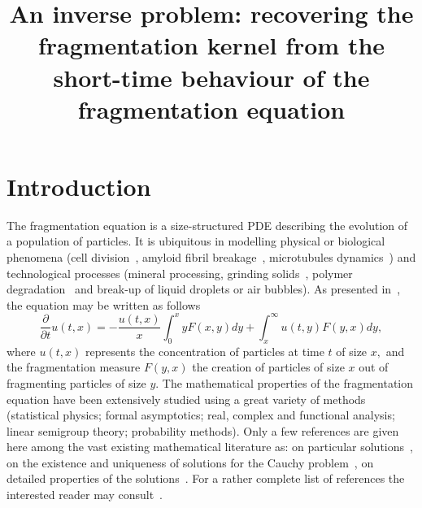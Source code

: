 \documentclass[AHL,Unicode,longabstracts,published]{cedram}
\title[Inverse problem for the fragmentation kernel]{An inverse problem: recovering the fragmentation kernel from the short-time behaviour of the fragmentation equation}
\author[\initial{M.} \lastname{Doumic}]{\firstname{Marie} \lastname{Doumic}}
\author[\initial{M.} \lastname{Escobedo}]{\firstname{Miguel} \lastname{Escobedo}}
\author[\initial{M.} \lastname{Tournus}]{\firstname{Magali} \lastname{Tournus}}
\newcommand*\dst{\displaystyle}
\newcommand*\p{\partial}
\begin{document}
\maketitle


\section{Introduction}\label{sec:intro}
The fragmentation equation is a size-structured PDE describing the evolution of a population of particles. It is ubiquitous in modelling physical or biological phenomena (cell division~\cite{Perthame2007}, amyloid fibril breakage~\cite{XR13}, microtubules dynamics~\cite{HHTW18}) and technological processes (mineral processing, grinding solids~\cite{Kolmogorov40}, polymer degradation~\cite{Montroll_Simha40} and break-up of liquid droplets or air bubbles).
As presented in~\cite{Melzak}, the equation may be written as follows
\begin{equation}\label{eq:frag_intro_gen}
\dfrac{\p}{\p t}u(t,x) =- \frac {u(t, x)} {x}\int _0^x y F(x, y)dy + \dst\int_{x}^{\infty} u(t,y)F(y, x) dy,
\end{equation}
where $u(t,x)$ represents the concentration of particles at time $t$ of size $x,$ and the fragmentation measure $F(y,x)$ the creation of particles of size $x$ out of fragmenting particles of size $y$. The mathematical properties of the fragmentation equation have been extensively studied using a great variety of methods (statistical physics; formal asymptotics; real, complex and functional analysis; linear semigroup theory; probability methods). Only a few references are given here among the vast existing mathematical literature as: on particular solutions~\cite{Montroll_Simha40, ZiffMcGrady85}, on the existence and uniqueness of solutions for the Cauchy problem~\cite{Banasiak1,BallCarr, DubovskiStewart,Melzak, MLM, Stewart90}, on detailed properties of the solutions~\cite{BCG13,Bertoin1,CCM,  Haas2008,PerthameRyzhik}. For a rather complete list of references the interested reader may consult~\cite{Banasiak1, zora77208,Banasiak2}.
\end{document}
